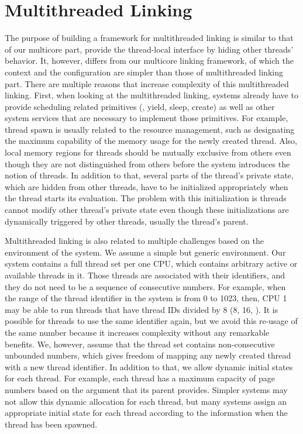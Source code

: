 \section{Multithreaded Linking}
\label{chapter:linking:sec:multithreaded-linking}


The purpose of building a framework for multithreaded linking is similar to  that of our multicore part,
provide the thread-local interface by hiding other threads' behavior. 
It, however, differs from our multicore linking framework, of which the  context and the configuration 
are simpler than those of multithreaded linking part.
There are multiple reasons that increase complexity of this multithreaded linking. 
First, when looking at the multithreaded linking, 
systems already have to provide 
scheduling related primitives (\ie, yield, sleep, create)
as well as other system services 
that are necessary to implement those primitives. 
For example, 
thread spawn is usually related to the 
resource management,
such as designating the maximum capability of the memory usage 
for the newly created thread. 
Also, 
local memory regions for threads should be 
mutually exclusive from others even though 
they are not distinguished from others before the system introduces the notion of threads.
In addition to that, 
several parts of the thread's private state,
which are hidden from other threads,
have to be initialized appropriately when the thread starts its evaluation.
The problem with this initialization is threads cannot modify other thread's private state even though these initializations are dynamically triggered by
other threads, usually the thread's parent. 

Multithreaded linking is also related to 
multiple challenges based on the environment of the system.
We assume a simple but generic environment. 
Our system contains a full thread set per one CPU,
which contains arbitrary active or available threads in it.
Those threads are associated with their identifiers, and they do not need to be a sequence of consecutive numbers.
For example, when the range of
the thread identifier in the system is from 0 to 1023, 
then, CPU 1 may be able to run threads that have thread IDs divided by 8 (8, 16, \etc). 
It is possible for threads to use the same identifier again, but we avoid this re-usage of the same number because it increases complexity without any remarkable benefits. 
We, however, assume that the thread set contains non-consecutive unbounded numbers,
which gives freedom of mapping any newly created thread with a new thread identifier. 
In addition to that, 
we allow dynamic initial states for each thread. 
For example, each thread has a maximum capacity of page numbers based on the argument that its parent 
provides.
Simpler systems may not allow this dynamic allocation for each thread,
but many systems assign an appropriate initial state for each thread 
according to the information when the thread has been spawned.

